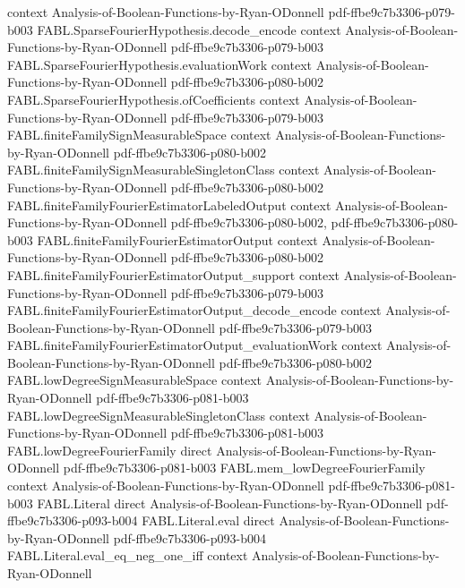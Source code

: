 \begin{theorem}
  {context}
  {Analysis-of-Boolean-Functions-by-Ryan-ODonnell}
  {pdf-ffbe9c7b3306-p079-b003}
\proofstep
  {FABL.SparseFourierHypothesis.decode_encode}
  {context}
  {Analysis-of-Boolean-Functions-by-Ryan-ODonnell}
  {pdf-ffbe9c7b3306-p079-b003}
\proofstep
  {FABL.SparseFourierHypothesis.evaluationWork}
  {context}
  {Analysis-of-Boolean-Functions-by-Ryan-ODonnell}
  {pdf-ffbe9c7b3306-p080-b002}
\proofstep
  {FABL.SparseFourierHypothesis.ofCoefficients}
  {context}
  {Analysis-of-Boolean-Functions-by-Ryan-ODonnell}
  {pdf-ffbe9c7b3306-p079-b003}
\proofstep
  {FABL.finiteFamilySignMeasurableSpace}
  {context}
  {Analysis-of-Boolean-Functions-by-Ryan-ODonnell}
  {pdf-ffbe9c7b3306-p080-b002}
\proofstep
  {FABL.finiteFamilySignMeasurableSingletonClass}
  {context}
  {Analysis-of-Boolean-Functions-by-Ryan-ODonnell}
  {pdf-ffbe9c7b3306-p080-b002}
\proofstep
  {FABL.finiteFamilyFourierEstimatorLabeledOutput}
  {context}
  {Analysis-of-Boolean-Functions-by-Ryan-ODonnell}
  {pdf-ffbe9c7b3306-p080-b002,
    pdf-ffbe9c7b3306-p080-b003}
\proofstep
  {FABL.finiteFamilyFourierEstimatorOutput}
  {context}
  {Analysis-of-Boolean-Functions-by-Ryan-ODonnell}
  {pdf-ffbe9c7b3306-p080-b002}
\proofstep
  {FABL.finiteFamilyFourierEstimatorOutput_support}
  {context}
  {Analysis-of-Boolean-Functions-by-Ryan-ODonnell}
  {pdf-ffbe9c7b3306-p079-b003}
\proofstep
  {FABL.finiteFamilyFourierEstimatorOutput_decode_encode}
  {context}
  {Analysis-of-Boolean-Functions-by-Ryan-ODonnell}
  {pdf-ffbe9c7b3306-p079-b003}
\proofstep
  {FABL.finiteFamilyFourierEstimatorOutput_evaluationWork}
  {context}
  {Analysis-of-Boolean-Functions-by-Ryan-ODonnell}
  {pdf-ffbe9c7b3306-p080-b002}
\proofstep
  {FABL.lowDegreeSignMeasurableSpace}
  {context}
  {Analysis-of-Boolean-Functions-by-Ryan-ODonnell}
  {pdf-ffbe9c7b3306-p081-b003}
\proofstep
  {FABL.lowDegreeSignMeasurableSingletonClass}
  {context}
  {Analysis-of-Boolean-Functions-by-Ryan-ODonnell}
  {pdf-ffbe9c7b3306-p081-b003}
\proofstep
  {FABL.lowDegreeFourierFamily}
  {direct}
  {Analysis-of-Boolean-Functions-by-Ryan-ODonnell}
  {pdf-ffbe9c7b3306-p081-b003}
\proofstep
  {FABL.mem_lowDegreeFourierFamily}
  {context}
  {Analysis-of-Boolean-Functions-by-Ryan-ODonnell}
  {pdf-ffbe9c7b3306-p081-b003}
\proofstep
  {FABL.Literal}
  {direct}
  {Analysis-of-Boolean-Functions-by-Ryan-ODonnell}
  {pdf-ffbe9c7b3306-p093-b004}
\proofstep
  {FABL.Literal.eval}
  {direct}
  {Analysis-of-Boolean-Functions-by-Ryan-ODonnell}
  {pdf-ffbe9c7b3306-p093-b004}
\proofstep
  {FABL.Literal.eval_eq_neg_one_iff}
  {context}
  {Analysis-of-Boolean-Functions-by-Ryan-ODonnell}

\end{theorem}
